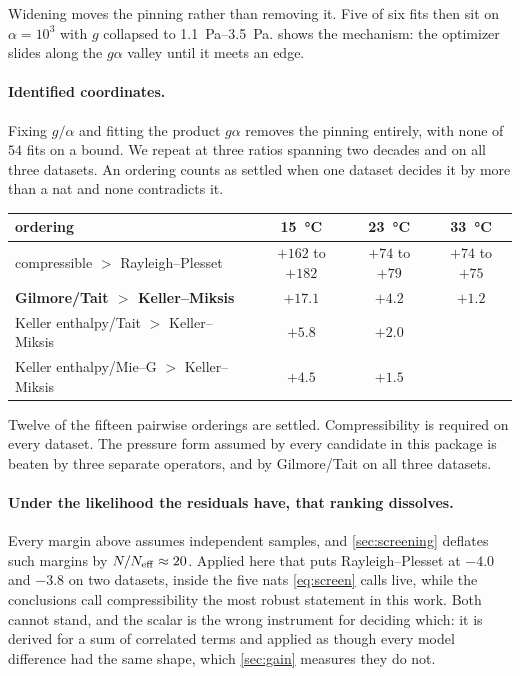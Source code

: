 \documentclass[10pt]{article}
\begin{document}
Widening moves the pinning rather than removing it. Five of six fits then sit on
$\alpha=10^3$ with $g$ collapsed to \SIrange{1.1}{3.5}{\pascal}.  shows the
mechanism: the optimizer slides along the $g\alpha$ valley until it meets an edge.

\paragraph{Identified coordinates.} Fixing $g/\alpha$ and fitting the product $g\alpha$
removes the pinning entirely, with none of $54$ fits on a bound. We repeat at three ratios
spanning two decades and on all three datasets. An ordering counts as settled when one dataset
decides it by more than a nat and none contradicts it.

\begin{center}
\begin{tabular}{lccc}
\toprule
ordering & \SI{15}{\celsius} & \SI{23}{\celsius} & \SI{33}{\celsius} \\
\midrule
compressible $>$ Rayleigh--Plesset & $+162$ to $+182$ & $+74$ to $+79$ & $+74$ to $+75$ \\
\textbf{Gilmore/Tait $>$ Keller--Miksis} & $\mathbf{+17.1}$ & $\mathbf{+4.2}$ & $\mathbf{+1.2}$ \\
Keller enthalpy/Tait $>$ Keller--Miksis & $+5.8$ & $+2.0$ & \\
Keller enthalpy/Mie--G $>$ Keller--Miksis & $+4.5$ & $+1.5$ & \\
\bottomrule
\end{tabular}
\end{center}

Twelve of the fifteen pairwise orderings are settled. Compressibility is required on every
dataset. The pressure form assumed by every candidate in this package is beaten by three
separate operators, and by Gilmore/Tait on all three datasets.

\paragraph{Under the likelihood the residuals have, that ranking dissolves.}
Every margin above assumes independent samples, and \cref{sec:screening} deflates such margins
by $N/N_{\rm eff} \approx 20$. Applied here that puts Rayleigh--Plesset at $-4.0$ and $-3.8$ on
two datasets, inside the five nats \eqref{eq:screen} calls live, while the conclusions call
compressibility the most robust statement in this work. Both cannot stand, and the scalar is the
wrong instrument for deciding which: it is derived for a sum of correlated terms and applied as
though every model difference had the same shape, which \cref{sec:gain} measures they do not.
\end{document}
